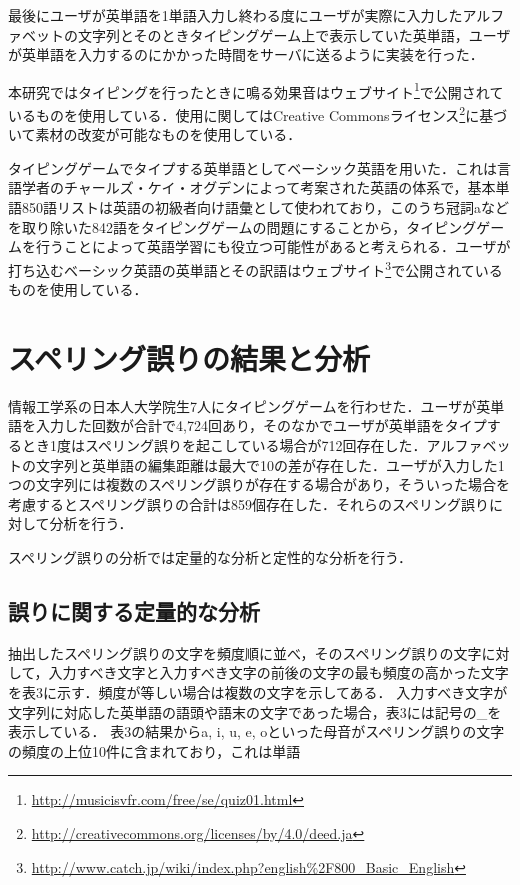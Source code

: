 \documentclass{jarticle}
\begin{document}
最後にユーザが英単語を1単語入力し終わる度にユーザが実際に入力したアルファベットの文字列とそのときタイピングゲーム上で表示していた英単語，ユーザが英単語を入力するのにかかった時間をサーバに送るように実装を行った．

本研究ではタイピングを行ったときに鳴る効果音はウェブサイト\footnote{\url{http://musicisvfr.com/free/se/quiz01.html}}で公開されているものを使用している．使用に関してはCreative Commonsライセンス\footnote{\url{http://creativecommons.org/licenses/by/4.0/deed.ja}}に基づいて素材の改変が可能なものを使用している．

タイピングゲームでタイプする英単語としてベーシック英語\cite{simpleenglish}を用いた．これは言語学者のチャールズ・ケイ・オグデンによって考案された英語の体系で，基本単語850語リストは英語の初級者向け語彙として使われており，このうち冠詞aなどを取り除いた842語をタイピングゲームの問題にすることから，タイピングゲームを行うことによって英語学習にも役立つ可能性があると考えられる．ユーザが打ち込むベーシック英語の英単語とその訳語はウェブサイト\footnote{\url{http://www.catch.jp/wiki/index.php?english\%2F800_Basic_English}}で公開されているものを使用している．

\section{スペリング誤りの結果と分析}
情報工学系の日本人大学院生7人にタイピングゲームを行わせた．ユーザが英単語を入力した回数が合計で4,724回あり，そのなかでユーザが英単語をタイプするとき1度はスペリング誤りを起こしている場合が712回存在した．アルファベットの文字列と英単語の編集距離は最大で10の差が存在した．ユーザが入力した1つの文字列には複数のスペリング誤りが存在する場合があり，そういった場合を考慮するとスペリング誤りの合計は859個存在した．それらのスペリング誤りに対して分析を行う．

スペリング誤りの分析では定量的な分析と定性的な分析を行う．

\subsection{誤りに関する定量的な分析}
抽出したスペリング誤りの文字を頻度順に並べ，そのスペリング誤りの文字に対して，入力すべき文字と入力すべき文字の前後の文字の最も頻度の高かった文字を表3に示す．頻度が等しい場合は複数の文字を示してある．
入力すべき文字が文字列に対応した英単語の語頭や語末の文字であった場合，表3には記号の\_を表示している．
表3の結果からa, i, u, e, oといった母音がスペリング誤りの文字の頻度の上位10件に含まれており，これは単語
\end{document}
